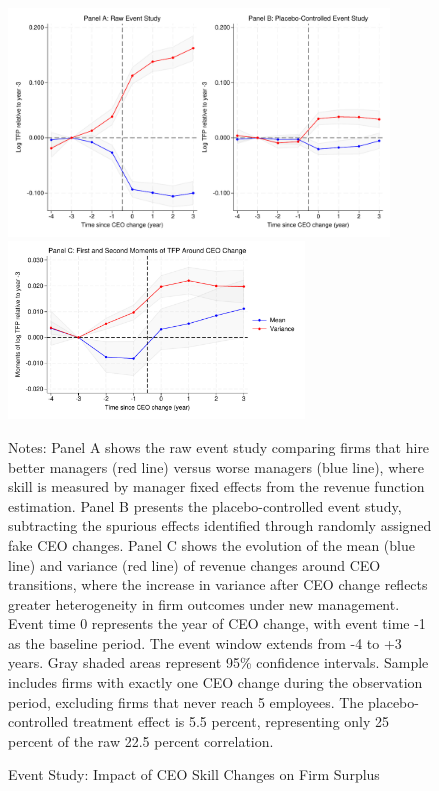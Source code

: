 \documentclass[11pt,a4paper]{article}
\begin{document}
\begin{figure}[htbp]
\centering
\includegraphics[width=0.9\textwidth]{figure/event_study.pdf}
\includegraphics[width=0.7\textwidth]{figure/event_study_panel_c.pdf}
\caption{Event Study: Impact of CEO Skill Changes on Firm Surplus}
\label{fig:event_study}
\footnotesize
Notes: Panel A shows the raw event study comparing firms that hire better managers (red line) versus worse managers (blue line), where skill is measured by manager fixed effects from the revenue function estimation. Panel B presents the placebo-controlled event study, subtracting the spurious effects identified through randomly assigned fake CEO changes. Panel C shows the evolution of the mean (blue line) and variance (red line) of revenue changes around CEO transitions, where the increase in variance after CEO change reflects greater heterogeneity in firm outcomes under new management. Event time 0 represents the year of CEO change, with event time -1 as the baseline period. The event window extends from -4 to +3 years. Gray shaded areas represent 95\% confidence intervals. Sample includes firms with exactly one CEO change during the observation period, excluding firms that never reach 5 employees. The placebo-controlled treatment effect is 5.5 percent, representing only 25 percent of the raw 22.5 percent correlation.
\end{figure}
\end{document}
